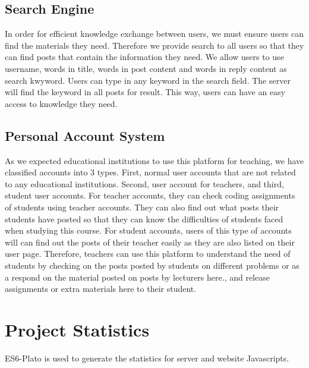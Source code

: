 \subsection{Search Engine}
In order for efficient knowledge exchange between users, we must ensure users can find the materials they need. Therefore we provide search to all users so that they can find posts that contain the information they need. We allow users to use username, words in title, words in post content and words in reply content as search kwyword. Users can type in any keyword in the search field. The server will find the keyword in all posts for result. This way, users can have an easy access to knowledge they need.

\subsection{Personal Account System}
As we expected educational institutions to use this platform for teaching, we have classified accounts into 3 types. First, normal user accounts that are not related to any educational institutions. Second, user account for teachers, and third, student user accounts. For teacher accounts, they can check coding assignments of students using teacher accounts. They can also find out what posts their students have posted so that they can know the difficulties of students faced when studying this course. For student accounts, users of this type of accounts will can find out the posts of their teacher easily as they are also listed on their user page. Therefore, teachers can use this platform to understand the need of students by checking on the posts posted by students on different problems or as a respond on the material posted on posts by lecturers here., and release assignments or extra materials here to their student.

\newpage

\section{Project Statistics}
ES6-Plato is used to generate the statistics for server and website Javascripts\cite{ES6-Plato}.

